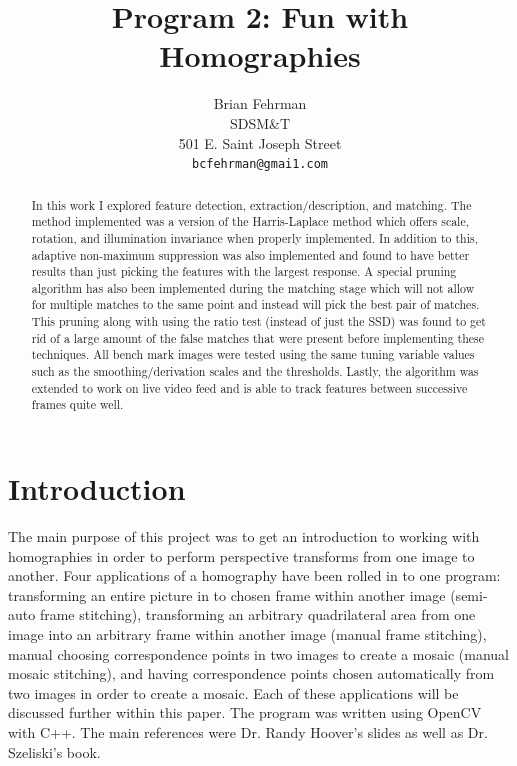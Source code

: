 \documentclass[10pt,twocolumn,letterpaper]{article}
\begin{document}
\title{ Program 2: Fun with Homographies}

\author{Brian Fehrman\\
SDSM\&T\\
501 E. Saint Joseph Street\\
{\tt\small bcfehrman@gmai1.com}
\thispagestyle{empty}
}

\maketitle
\begin{abstract}
In this work I explored feature detection, extraction/description, and matching. The method implemented was a version of the Harris-Laplace method which offers scale, rotation, and illumination invariance when properly implemented. In addition to this, adaptive non-maximum suppression was also implemented and found to have better results than just picking the features with the largest response. A special pruning algorithm has also been implemented during the matching stage which will not allow for multiple matches to the same point and instead will pick the best pair of matches. This pruning along with using the ratio test (instead of just the SSD) was found to get rid of a large amount of the false matches that were present before implementing these techniques. All bench mark images were tested using the same tuning variable values such as the smoothing/derivation scales and the thresholds. Lastly, the algorithm was extended to work on live video feed and is able to track features between successive frames quite well.

\end{abstract}



\section{Introduction}
The main purpose of this project was to get an introduction to working with homographies in order to perform perspective transforms from one image to another. Four applications of a homography have been rolled in to one program: transforming an entire picture in to chosen frame within another image (semi-auto frame stitching), transforming an arbitrary quadrilateral area from one image into an arbitrary frame within another image (manual frame stitching), manual choosing correspondence points in two images to create a mosaic (manual mosaic stitching), and having correspondence points chosen automatically from two images in order to create a mosaic. Each of these applications will be discussed further within this paper. The program was written using OpenCV with C++. The main references were Dr. Randy Hoover's slides as well as Dr. Szeliski's book.
\end{document}
